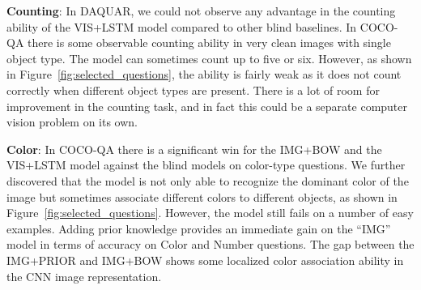 \documentclass{article}
\renewcommand{\#}[1]{\textbf{#1}}
\begin{document}
\textbf{Counting}:
In DAQUAR, we could not observe any advantage 
in the counting ability of the
VIS+LSTM model compared to other blind baselines. 
In COCO-QA there is some
observable counting ability in very clean images 
with single object type. The
model can sometimes count up to five or six. 
However, as shown in
Figure~\ref{fig:selected_questions}, the ability is 
fairly weak as it does not
count correctly when different object types are present. 
There is a lot of room for improvement in the counting task, 
and in fact this could be a separate computer vision problem on its own. 

\textbf{Color}:
In COCO-QA there is a significant win for the IMG+BOW and the
VIS+LSTM model against the blind
models on color-type questions. We further discovered that the model is not
only able to recognize the dominant color of the image but sometimes associate
different colors to different objects, as shown in
Figure~\ref{fig:selected_questions}. However, the model still fails on a number of 
easy examples. 
Adding prior knowledge provides an immediate gain on
the ``IMG'' model in terms of accuracy on Color and Number questions. 
The gap between the IMG+PRIOR and IMG+BOW shows some localized 
color association ability in the CNN image representation.
\end{document}
